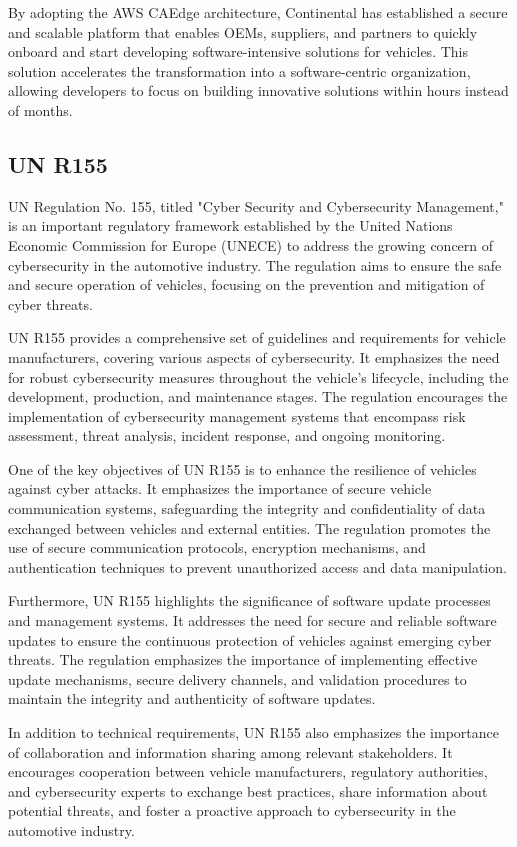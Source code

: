 \documentclass[
12pt,
oneside, 
onehalfspacing, 
nolistspacing, 
parskip, 
chapterinoneline, 
]{AASTCOMPUTER}
\begin{document}
By adopting the AWS CAEdge architecture, Continental has established a secure and scalable platform that enables OEMs, suppliers, and partners to quickly onboard and start developing software-intensive solutions for vehicles. This solution accelerates the transformation into a software-centric organization, allowing developers to focus on building innovative solutions within hours instead of months.

\subsection{UN R155}
UN Regulation No. 155, titled "Cyber Security and Cybersecurity Management," \cite{UNR155} is an important regulatory framework established by the United Nations Economic Commission for Europe (UNECE) to address the growing concern of cybersecurity in the automotive industry. The regulation aims to ensure the safe and secure operation of vehicles, focusing on the prevention and mitigation of cyber threats.

UN R155 provides a comprehensive set of guidelines and requirements for vehicle manufacturers, covering various aspects of cybersecurity. It emphasizes the need for robust cybersecurity measures throughout the vehicle's lifecycle, including the development, production, and maintenance stages. The regulation encourages the implementation of cybersecurity management systems that encompass risk assessment, threat analysis, incident response, and ongoing monitoring.

One of the key objectives of UN R155 is to enhance the resilience of vehicles against cyber attacks. It emphasizes the importance of secure vehicle communication systems, safeguarding the integrity and confidentiality of data exchanged between vehicles and external entities. The regulation promotes the use of secure communication protocols, encryption mechanisms, and authentication techniques to prevent unauthorized access and data manipulation.

Furthermore, UN R155 highlights the significance of software update processes and management systems. It addresses the need for secure and reliable software updates to ensure the continuous protection of vehicles against emerging cyber threats. The regulation emphasizes the importance of implementing effective update mechanisms, secure delivery channels, and validation procedures to maintain the integrity and authenticity of software updates.

In addition to technical requirements, UN R155 also emphasizes the importance of collaboration and information sharing among relevant stakeholders. It encourages cooperation between vehicle manufacturers, regulatory authorities, and cybersecurity experts to exchange best practices, share information about potential threats, and foster a proactive approach to cybersecurity in the automotive industry.
\end{document}
